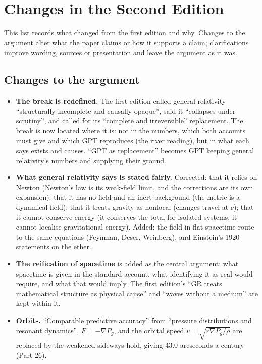 \documentclass[11pt,a4paper]{article}
\begin{document}
\clearpage
\section*{Changes in the Second Edition}

This list records what changed from the first edition and why. Changes to the argument alter what the paper claims or how it supports a claim; clarifications improve wording, sources or presentation and leave the argument as it was.

\subsection*{Changes to the argument}
\begin{itemize}
\item \textbf{The break is redefined.} The first edition called general relativity ``structurally incomplete and causally opaque'', said it ``collapses under scrutiny'', and called for its ``complete and irreversible'' replacement. The break is now located where it is: not in the numbers, which both accounts must give and which GPT reproduces (the river reading), but in what each says exists and causes. ``GPT as replacement'' becomes GPT keeping general relativity's numbers and supplying their ground.
\item \textbf{What general relativity says is stated fairly.} Corrected: that it relies on Newton (Newton's law is its weak-field limit, and the corrections are its own expansion); that it has no field and an inert background (the metric is a dynamical field); that it treats gravity as nonlocal (changes travel at $c$); that it cannot conserve energy (it conserves the total for isolated systems; it cannot localise gravitational energy). Added: the field-in-flat-spacetime route to the same equations (Feynman, Deser, Weinberg), and Einstein's 1920 statements on the ether.
\item \textbf{The reification of spacetime} is added as the central argument: what spacetime is given in the standard account, what identifying it as real would require, and what that would imply. The first edition's ``GR treats mathematical structure as physical cause'' and ``waves without a medium'' are kept within it.
\item \textbf{Orbits.} ``Comparable predictive accuracy'' from ``pressure distributions and resonant dynamics'', $F = -\nabla P_g$, and the orbital speed $v = \sqrt{r\nabla P_g/\rho}$ are replaced by the weakened sideways hold, giving 43.0 arcseconds a century (Part 26).

\end{itemize}
\end{document}
